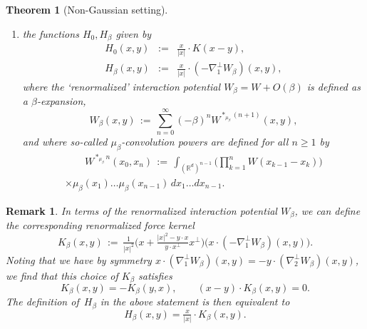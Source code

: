 \documentclass[a4paper,11pt,reqno,noindent]{amsart}
\theoremstyle{plain}
\newtheorem{theor}[lem]{Theorem}
\newtheorem{rem}[lem]{Remark}
\numberwithin{equation}{section}
\newcommand{\R}{\mathbb R}
\newcommand{\3}{|\!|\!|}
\begin{document}
\begin{theor}[Non-Gaussian setting]
\begin{enumerate}[$\bullet$]
with
\begin{eqnarray*}
iL_\beta h(x)&:=&-\beta^{-1}\nabla\log\mu_\beta(x)\cdot\nabla^\bot h(x),\\
iT_\beta h(x)&:=&\beta^{-1}\nabla\log\mu_\beta(x)\cdot\int_{\R^2}K(x-x_*)h(x_*)\,\mu_\beta(x_*)\,dx_*;
\end{eqnarray*}
\item the functions $H_0,H_\beta$ given by
\begin{eqnarray}
H_0(x,y)&:=&\tfrac{x}{|x|}\cdot K(x-y),\label{eq:def-HbH0}\\
H_\beta(x,y)&:=&\tfrac{x}{|x|}\cdot(-\nabla_1^\bot W_\beta)(x,y),\nonumber
\end{eqnarray}
where the `renormalized' interaction potential $W_\beta=W+O(\beta)$ is defined as a $\beta$-expansion,
\begin{equation}\label{eq:def-Wbeta}
W_\beta(x,y)\,:=\,\sum_{n=0}^\infty(-\beta)^nW^{\ast_{\mu_\beta}(n+1)}(x,y),
\end{equation}
and where so-called $\mu_\beta$-convolution powers are defined for all $n\ge1$ by
\begin{multline}\label{eq:def-Wconvsp}
\qquad W^{\ast_{\mu_\beta}n}(x_0,x_n)\,:=\,\int_{(\R^d)^{n-1}}\Big(\prod_{k=1}^nW(x_{k-1}-x_k)\Big)\\
\times\mu_\beta(x_1)\ldots \mu_\beta(x_{n-1})\,dx_1\ldots dx_{n-1}.
\end{multline}
\end{enumerate}
\end{theor}

\begin{rem}
In terms of the renormalized interaction potential $W_\beta$, we can define the corresponding renormalized force kernel
\begin{equation*}
K_\beta(x,y)\,:=\,
\tfrac1{|x|^2}\Big(x+\tfrac{|x|^2-y\cdot x}{y\cdot x^\bot}x^\bot \Big)
\Big(x\cdot(-\nabla_1^\bot W_\beta)(x,y)\Big).
\end{equation*}
Noting that we have by symmetry $x\cdot(\nabla_1^\bot W_\beta)(x,y)=-y\cdot(\nabla_2^\bot W_\beta)(x,y)$, we find that this choice of $K_\beta$ satisfies
\[K_\beta(x,y)=-K_\beta(y,x),\qquad (x-y)\cdot K_\beta(x,y)=0.\]
The definition of~$H_\beta$ in the above statement is then equivalent to
\[H_\beta(x,y)=\tfrac{x}{|x|}\cdot K_\beta(x,y).\]
\end{rem}
\end{document}
